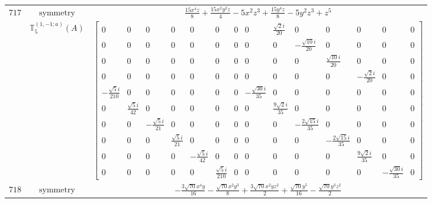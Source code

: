 \documentclass[fleqn,8pt,landscape]{jsarticle}
\begin{document}
\begin{longtable}{ccc}
$ 717 $ & $ \text{symmetry} $ & $ \frac{15 x^{4} z}{8} + \frac{15 x^{2} y^{2} z}{4} - 5 x^{2} z^{3} + \frac{15 y^{4} z}{8} - 5 y^{2} z^{3} + z^{5} $ \\
$  $ & $ \mathbb{T}_{5}^{(1,-1;a)}(A) $ & $ \begin{bmatrix} 0 & 0 & 0 & 0 & 0 & 0 & 0 & 0 & \frac{\sqrt{2} i}{20} & 0 & 0 & 0 & 0 & 0 \\ 0 & 0 & 0 & 0 & 0 & 0 & 0 & 0 & 0 & - \frac{\sqrt{10} i}{20} & 0 & 0 & 0 & 0 \\ 0 & 0 & 0 & 0 & 0 & 0 & 0 & 0 & 0 & 0 & \frac{\sqrt{10} i}{20} & 0 & 0 & 0 \\ 0 & 0 & 0 & 0 & 0 & 0 & 0 & 0 & 0 & 0 & 0 & - \frac{\sqrt{2} i}{20} & 0 & 0 \\ - \frac{\sqrt{5} i}{210} & 0 & 0 & 0 & 0 & 0 & 0 & - \frac{\sqrt{30} i}{35} & 0 & 0 & 0 & 0 & 0 & 0 \\ 0 & \frac{\sqrt{5} i}{42} & 0 & 0 & 0 & 0 & 0 & 0 & \frac{9 \sqrt{2} i}{35} & 0 & 0 & 0 & 0 & 0 \\ 0 & 0 & - \frac{\sqrt{5} i}{21} & 0 & 0 & 0 & 0 & 0 & 0 & - \frac{2 \sqrt{15} i}{35} & 0 & 0 & 0 & 0 \\ 0 & 0 & 0 & \frac{\sqrt{5} i}{21} & 0 & 0 & 0 & 0 & 0 & 0 & - \frac{2 \sqrt{15} i}{35} & 0 & 0 & 0 \\ 0 & 0 & 0 & 0 & - \frac{\sqrt{5} i}{42} & 0 & 0 & 0 & 0 & 0 & 0 & \frac{9 \sqrt{2} i}{35} & 0 & 0 \\ 0 & 0 & 0 & 0 & 0 & \frac{\sqrt{5} i}{210} & 0 & 0 & 0 & 0 & 0 & 0 & - \frac{\sqrt{30} i}{35} & 0 \end{bmatrix} $ \\ \hline
$ 718 $ & $ \text{symmetry} $ & $ - \frac{3 \sqrt{70} x^{4} y}{16} - \frac{\sqrt{70} x^{2} y^{3}}{8} + \frac{3 \sqrt{70} x^{2} y z^{2}}{2} + \frac{\sqrt{70} y^{5}}{16} - \frac{\sqrt{70} y^{3} z^{2}}{2} $ \\

\end{longtable}
\end{document}
